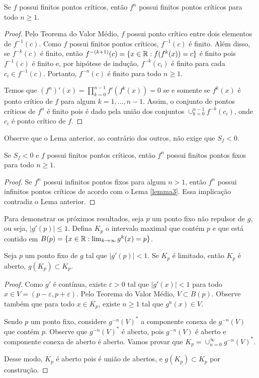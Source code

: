 \begin{lemma}
Se $f$ possui finitos pontos críticos, então $f^n$ possui finitos pontos críticos para todo $n \geq 1$.
\end{lemma}
\begin{proof}

Pelo Teorema do Valor Médio, $f$ possui ponto crítico entre dois elementos de $f^{-1}(c)$. Como $f$ possui finitos pontos críticos, $f^{-1}(c)$ é finito. Além disso, se $f^{-k}(c)$ é finito, então $f^{-(k+1)}(c) = \{ x \in \mathbb{R} : f(f^k(x)) = c \}$ é finito pois $f^{-1}(c)$ é finito e, por hipótese de indução, $f^{-k}(c_ i)$ é finito para cada $c_i \in f^{-1}(c)$. Portanto, $f^{-n}(c)$ é finito para todo $n \geq 1$.

Temos que $(f^n)'(x) = \prod_{k=0}^{n-1} f'(f^k(x)) = 0$ se e somente se $f^k(x)$ é ponto crítico de $f$ para algum $k = 1, \dots, n-1$. Assim, o conjunto de pontos críticos de $f^n$ é finito pois é dado pela união dos conjuntos $\cup_{k=0}^{n-1} f^{-k}(c_i)$, onde $c_i$ é ponto crítico de $f$.
\end{proof}

Observe que o Lema anterior, ao contrário dos outros, não exige que $S_f < 0$.

\begin{lemma}
Se $S_f < 0$ e $f$ possui finitos pontos críticos, então $f^n$ possui finitos pontos fixos para todo $n \geq 1$.
\end{lemma}
\begin{proof}
Se $f^n$ possui infinitos pontos fixos para algum $n > 1$, então $f^n$ possui infinitos pontos críticos de acordo com o Lema \ref{lemma3}. Essa implicação contradiz o Lema anterior.
\end{proof}

Para demonstrar os próximos resultados, seja $p$ um ponto fixo não repulsor de $g$, ou seja, $|g'(p)| \leq 1$. Defina $K_p$ o intervalo maximal que contém $p$ e que está contido em $B(p) = \{ x \in \mathbb{R} : \lim_{k \to \infty} g^k(x) = p \}$.

\begin{lemma}
Seja $p$ um ponto fixo de $g$ tal que $|g'(p)| < 1$. Se $K_p$ é limitado, então $K_p$ é aberto, $g(K_p) \subset K_p$.
\end{lemma}

\begin{proof}
Como $g'$ é contínua, existe $\varepsilon > 0$ tal que $|g'(x)| < 1$ para todo $x \in V = (p - \varepsilon, p + \varepsilon)$. Pelo Teorema do Valor Médio, $V \subset B(p)$. Observe também que para todo $x \in K_p$, existe $n \geq 1$ tal que $g^n(x) \in V$.

Sendo $p$ um ponto fixo, considere $g^{-n}(V)^*$ a componente conexa de $g^{-n}(V)$ que contém $p$. Observe que $g^{-n}(V)^*$ é aberto, pois $g^{-n}(V)$ é aberto e componente conexa de aberto é aberto. Vamos provar que $K_p = \cup_{n=0}^{\infty} g^{-n}(V)^*$.

Desse modo, $K_p$ é aberto pois é união de abertos, e $g(K_p) \subset K_p$ por construção.
\end{proof}

